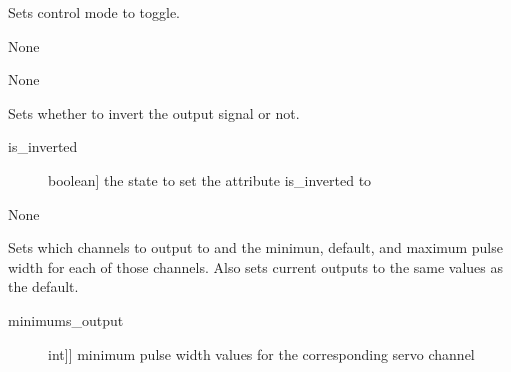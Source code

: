 \documentclass[letterpaper,10pt,english]{sphinxmanual}
\begin{document}
\begin{fulllineitems}

\begin{fulllineitems}
\label{\detokenize{base:OutputObject.OutputObject.set_control_toggle}}
\sphinxAtStartPar
Sets control mode to toggle.

\sphinxAtStartPar
None

\sphinxAtStartPar
None

\end{fulllineitems}


\begin{fulllineitems}
\label{\detokenize{base:OutputObject.OutputObject.set_inversion}}
\sphinxAtStartPar
Sets whether to invert the output signal or not.
\begin{description}
\item[{is\_inverted}] \leavevmode{[}boolean{]}
\sphinxAtStartPar
the state to set the attribute is\_inverted to

\end{description}

\sphinxAtStartPar
None

\end{fulllineitems}


\begin{fulllineitems}
\label{\detokenize{base:OutputObject.OutputObject.set_outputs}}
\sphinxAtStartPar
Sets which channels to output to and the minimun, default, and maximum pulse width for each of those channels.
Also sets current outputs to the same values as the default.
\begin{description}
\item[{minimums\_output}] \leavevmode{[}{[}int{]}{]}
\sphinxAtStartPar
minimum pulse width values for the corresponding servo channel


\end{description}
\end{fulllineitems}
\end{fulllineitems}
\end{document}
